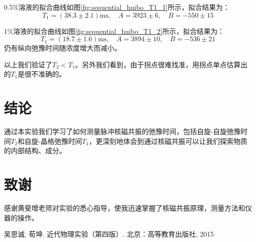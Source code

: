 \documentclass[aps,pre,12pt,preprint,onecolumn,showpacs,showkeys]{revtex4-1}
\begin{document}
        0.5\%溶液的拟合曲线如图\ref{fig:sequential_huibo_T1_1}所示，拟合结果为：
        \begin{equation}
            T_1=(38.3\pm2.1)\mathrm{ms},\quad A=3923\pm6, \quad B=-550\pm15
        \end{equation}

        1\%溶液的拟合曲线如图\ref{fig:sequential_huibo_T1_2}所示，拟合结果为：
        \begin{equation}
            T_1=(18.7\pm 1.6)\mathrm{ms},\quad A=3894\pm 10, \quad B=-536 \pm 21
        \end{equation}
        仍有纵向弛豫时间随浓度增大而减小。

        以上我们验证了$T_2<T_1$。另外我们看到，由于拐点很难找准，用拐点单点估算出的$T_1$是很不准确的。

    \section{结论}
        通过本实验我们学习了如何测量脉冲核磁共振的弛豫时间，包括自旋-自旋弛豫时间$T_2$和自旋-晶格弛豫时间$T_1$，更深刻地体会到通过核磁共振可以让我们探索物质的内部结构、成分。
    
    \section{致谢}
        感谢黄斐增老师对实验的悉心指导，使我迅速掌握了核磁共振原理，测量方法和仪器的操作。
        
    \begin{thebibliography}{}
     吴思诚, 荀坤. 近代物理实验（第四版）. 北京：高等教育出版社, 2015
    \end{thebibliography}
\end{document}
